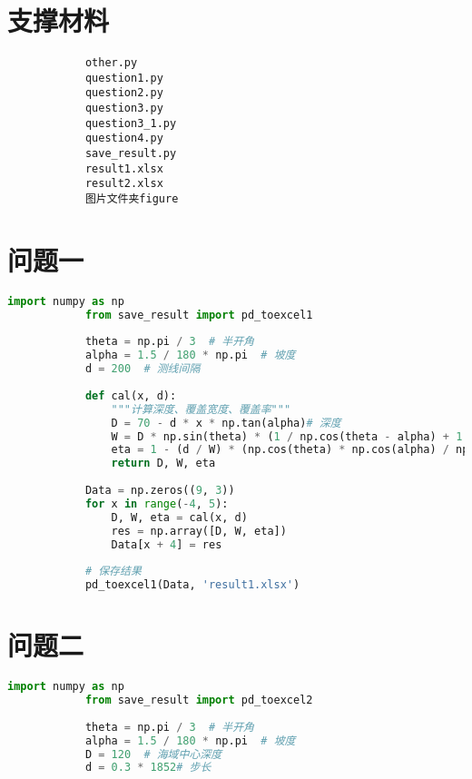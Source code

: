 \documentclass[withoutpreface,bwprint]{cumcmthesis} %
\begin{document}
        \begin{appendices}
            \section{支撑材料}
            \begin{lstlisting}
            other.py
            question1.py
            question2.py
            question3.py
            question3_1.py
            question4.py
            save_result.py
            result1.xlsx
            result2.xlsx
            图片文件夹figure
            \end{lstlisting}
            \section{问题一}

            \begin{lstlisting}[language=python]
            import numpy as np
            from save_result import pd_toexcel1
            
            theta = np.pi / 3  # 半开角
            alpha = 1.5 / 180 * np.pi  # 坡度
            d = 200  # 测线间隔
            
            def cal(x, d):
                """计算深度、覆盖宽度、覆盖率"""
                D = 70 - d * x * np.tan(alpha)# 深度 
                W = D * np.sin(theta) * (1 / np.cos(theta - alpha) + 1 / np.cos(theta + alpha)) * np.cos(alpha) # 覆盖宽度
                eta = 1 - (d / W) * (np.cos(theta) * np.cos(alpha) / np.cos(theta - alpha))  # 覆盖率
                return D, W, eta
            
            Data = np.zeros((9, 3))
            for x in range(-4, 5):
                D, W, eta = cal(x, d)
                res = np.array([D, W, eta])
                Data[x + 4] = res
            
            # 保存结果
            pd_toexcel1(Data, 'result1.xlsx')
            \end{lstlisting}

            \section{问题二}

            \begin{lstlisting}[language=python]
            import numpy as np
            from save_result import pd_toexcel2
            
            theta = np.pi / 3  # 半开角
            alpha = 1.5 / 180 * np.pi  # 坡度
            D = 120  # 海域中心深度
            d = 0.3 * 1852# 步长
            

\end{lstlisting}
\end{appendices}
\end{document}
